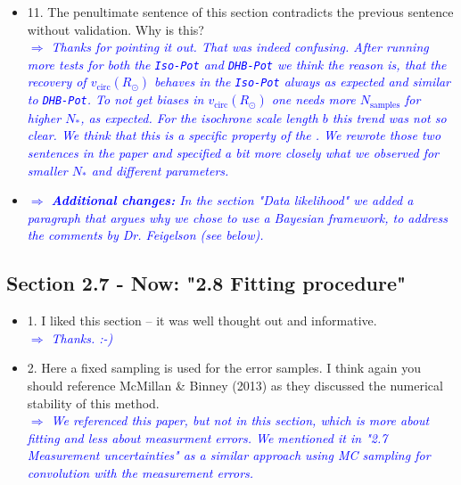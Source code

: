 \documentclass[10pt,a4paper]{article}
\newcommand{\Comment}[1]{\textsl{\textcolor{Blue}{$\Longrightarrow$ {#1}}}}
\begin{document}
\begin{itemize}
\item 11. The penultimate sentence of this section contradicts the previous sentence without validation. Why is this? \\\Comment{Thanks for pointing it out. That was indeed confusing. After running more tests for both the \texttt{Iso-Pot} and \texttt{DHB-Pot} we think the reason is, that the recovery of $v_\text{circ}(R_\odot)$ behaves in the \texttt{Iso-Pot} always as expected and similar to \texttt{DHB-Pot}. To not get biases in $v_\text{circ}(R_\odot)$ one needs more $N_\text{samples}$ for higher $N_*$, as expected. For the isochrone scale length $b$ this trend was not so clear. We think that this is a specific property of the \text{Iso-Pot}. We rewrote those two sentences in the paper and specified a bit more closely what we observed for smaller $N_*$ and different parameters.}
\item \Comment{\textbf{Additional changes:} In the section "Data likelihood" we added a paragraph that argues why we chose to use a Bayesian framework, to address the comments by Dr. Feigelson (see below).}
\end{itemize}

\subsection{Section 2.7 - Now: "2.8 Fitting procedure"}
\begin{itemize}
\item 1. I liked this section -- it was well thought out and informative. \\\Comment{Thanks. :-)}
\item 2. Here a fixed sampling is used for the error samples. I think again you should reference McMillan \& Binney (2013) as they discussed the numerical stability of this method. \\\Comment{We referenced this paper, but not in this section, which is more about fitting and less about measurment errors. We mentioned it in "2.7 Measurement uncertainties" as a similar approach using MC sampling for convolution with the measurement errors.}
\end{itemize}
\end{document}
